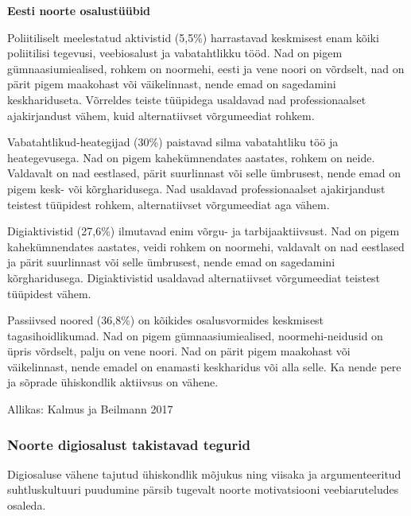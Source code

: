 \documentclass[estonian,]{article}
\begin{document}
\begin{casebox}
\textbf{Eesti noorte osalustüübid}

Poliitiliselt meelestatud aktivistid (5,5\%) harrastavad keskmisest enam
kõiki poliitilisi tegevusi, veebiosalust ja vabatahtlikku tööd. Nad on
pigem gümnaasiumiealised, rohkem on noormehi, eesti ja vene noori on
võrdselt, nad on pärit pigem maakohast või väikelinnast, nende emad on
sagedamini keskhariduseta. Võrreldes teiste tüüpidega usaldavad nad
professionaalset ajakirjandust vähem, kuid alternatiivset võrgumeediat
rohkem.

Vabatahtlikud-heategijad (30\%) paistavad silma vabatahtliku töö ja
heategevusega. Nad on pigem kahekümnendates aastates, rohkem on neide.
Valdavalt on nad eestlased, pärit suurlinnast või selle ümbrusest, nende
emad on pigem kesk- või kõrgharidusega. Nad usaldavad professionaalset
ajakirjandust teistest tüüpidest rohkem, alternatiivset võrgumeediat aga
vähem.

Digiaktivistid (27,6\%) ilmutavad enim võrgu- ja tarbijaaktiivsust. Nad
on pigem kahekümnendates aastates, veidi rohkem on noormehi, valdavalt
on nad eestlased ja pärit suurlinnast või selle ümbrusest, nende emad on
sagedamini kõrgharidusega. Digiaktivistid usaldavad alternatiivset
võrgumeediat teistest tüüpidest vähem.

Passiivsed noored (36,8\%) on kõikides osalusvormides keskmisest
tagasihoidlikumad. Nad on pigem gümnaasiumiealised, noormehi-neidusid on
üpris võrdselt, palju on vene noori. Nad on pärit pigem maakohast või
väikelinnast, nende emadel on enamasti keskharidus või alla selle. Ka
nende pere ja sõprade ühiskondlik aktiivsus on vähene.
\end{casebox}

\begin{imgsource}
{Allikas:} Kalmus ja Beilmann 2017
\end{imgsource}

\hypertarget{noorte-digiosalust-takistavad-tegurid}{%
\subsubsection*{Noorte digiosalust takistavad tegurid}\label{noorte-digiosalust-takistavad-tegurid}}

\begin{blockquote-right}
Digiosaluse vähene tajutud ühiskondlik mõjukus ning viisaka ja
argumenteeritud suhtluskultuuri puudumine pärsib tugevalt noorte
motivatsiooni veebiaruteludes osaleda.
\end{blockquote-right}
\end{document}
